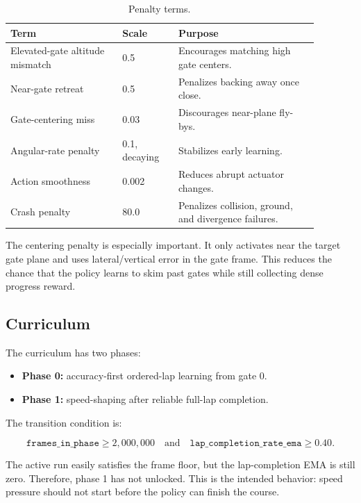 \documentclass[11pt]{article}
\begin{document}
\begin{table}[H]
\centering
\caption{Penalty terms.}
\label{tab:penalties}
\small
\begin{tabular}{p{0.32\linewidth}p{0.16\linewidth}p{0.40\linewidth}}
\toprule
\textbf{Term} & \textbf{Scale} & \textbf{Purpose} \\
\midrule
Elevated-gate altitude mismatch & 0.5 & Encourages matching high gate centers. \\
Near-gate retreat & 0.5 & Penalizes backing away once close. \\
Gate-centering miss & 0.03 & Discourages near-plane fly-bys. \\
Angular-rate penalty & 0.1, decaying & Stabilizes early learning. \\
Action smoothness & 0.002 & Reduces abrupt actuator changes. \\
Crash penalty & 80.0 & Penalizes collision, ground, and divergence failures. \\
\bottomrule
\end{tabular}
\end{table}

The centering penalty is especially important. It only activates near the target
gate plane and uses lateral/vertical error in the gate frame. This reduces the
chance that the policy learns to skim past gates while still collecting dense
progress reward.

\subsection{Curriculum}

The curriculum has two phases:

\begin{itemize}
  \item \textbf{Phase 0:} accuracy-first ordered-lap learning from gate 0.
  \item \textbf{Phase 1:} speed-shaping after reliable full-lap completion.
\end{itemize}

The transition condition is:

\begin{equation}
\texttt{frames\_in\_phase} \ge 2{,}000{,}000
\quad \mathrm{and} \quad
\texttt{lap\_completion\_rate\_ema} \ge 0.40.
\end{equation}

The active run easily satisfies the frame floor, but the lap-completion EMA is
still zero. Therefore, phase 1 has not unlocked. This is the intended behavior:
speed pressure should not start before the policy can finish the course.
\end{document}
